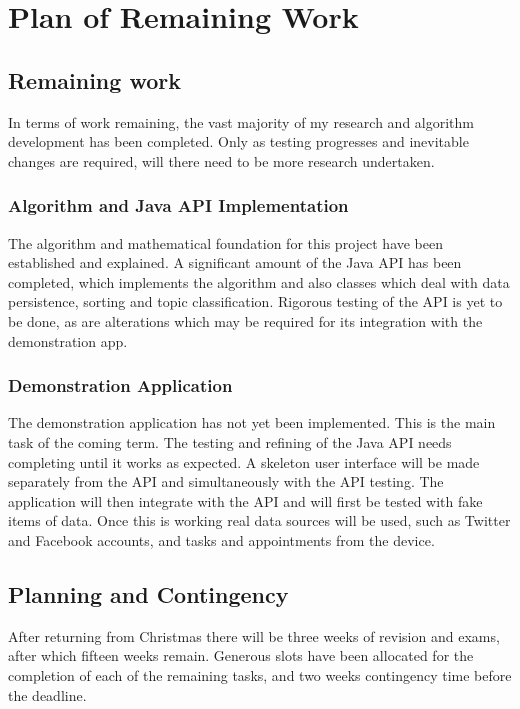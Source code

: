 \chapter{Plan of Remaining Work}

\section{Remaining work}

In terms of work remaining, the vast majority of my research and algorithm development has been completed. Only as testing progresses and inevitable changes are required, will there need to be more research undertaken. 

\subsection{Algorithm and Java API Implementation}

The algorithm and mathematical foundation for this project have been established and explained. A significant amount of the Java API has been completed, which implements the algorithm and also classes which deal with data persistence, sorting and topic classification. Rigorous testing of the API is yet to be done, as are alterations which may be required for its integration with the demonstration app. 

\subsection{Demonstration Application}

The demonstration application has not yet been implemented. This is the main task of the coming term. The testing and refining of the Java API needs completing until it works as expected. A skeleton user interface will be made separately from the API and simultaneously with the API testing. The application will then integrate with the API and will first be tested with fake items of data. Once this is working real data sources will be used, such as Twitter and Facebook accounts, and  tasks and appointments from the device. 

\section{Planning and Contingency}

After returning from Christmas there will be three weeks of revision and exams, after which fifteen weeks remain. Generous slots have been allocated for the completion of each of the remaining tasks, and two weeks contingency time before the deadline. 

